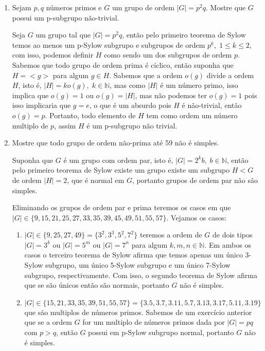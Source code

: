 \documentclass{article}
\begin{document}
\begin{enumerate}
		\item Sejam $p,q$ números primos e $G$ um grupo de ordem $|G| = p^{2}q$. Mostre que $G$ possui um p-subgrupo não-trivial.
		
		Seja $G$ um grupo tal que $|G| = p^{2}q$, então pelo primeiro teorema de Sylow temos ao menos um p-Sylow subgrupo e subgrupos de ordem $p^{k}, \; 1 \leq k \leq 2$, com isso, podemos definir $H$ como sendo um dos subgrupos de ordem $p$. Sabemos que todo grupo de ordem prima é cíclico, então suponha que $H = <g>$ para algum $g \in H$. Sabemos que a ordem $o(g)$ divide a ordem $H$, isto é, $|H| = ko(g), \; k \in \mathbb{N}$, mas como $|H|$ é um número primo, isso implica que $o(g) = 1$ ou $o(g) = |H|$, mas não podemos ter $o(g) = 1$ pois isso implicaria que $g = e$, o que é um absurdo pois $H$ é não-trivial, então $o(g) = p$. Portanto, todo elemento de $H$ tem como ordem um número multiplo de $p$, assim $H$ é um p-subgrupo não trivial.
		
		\item Mostre que todo grupo de ordem não-prima até 59 não é simples.
		
		Suponha que $G$ é um grupo com ordem par, isto é, $|G| = 2^{k}b, \; b \in \mathbb{N}$, então pelo primeiro teorema de Sylow existe um grupo existe um subgrupo $H < G$ de ordem $|H| = 2$, que é normal em $G$, portanto grupos de ordem par não são simples. 
		
		Eliminando os grupos de ordem par e prima teremos os casos em que $|G| \in \{9, 15, 21, 25, 27, 33, 35, 39, 45, 49, 51, 55, 57\}$. Vejamos os casos:
		\begin{enumerate}
			\item $|G| \in \{9, 25, 27, 49\}= \{3^{2}, 3^{3}, 5^{2}, 7^{2}\}$ teremos a ordem de $G$ de dois tipos $|G| =3^{k}$ ou $|G| =5^{m}$ ou $|G| =7^{n}$ para algum $k,m ,n \in \mathbb{N}$. Em ambos os casos o terceiro teorema de Sylow afirma que temos apenas um único 3-Sylow subgrupo, um único 5-Sylow subgrupo e um único 7-Sylow subgrupo, respectivamente. Com isso, o segundo teorema de Sylow afirma que se são únicos então são normais, portanto $G$ não é simples.
			
			\item $|G| \in \{15, 21, 33, 35, 39, 51, 55, 57\}= \{3.5, 3.7, 3.11, 5.7, 3.13, 3.17, 5.11, 3.19\}$ que são multiplos de números primos. Sabemos de um exercício anterior que se a ordem $G$ for um multiplo de números primos dada por $|G| = pq$ com $p>q$, então $G$ possui em p-Sylow subgrupo normal, portanto $G$ não é simples.
			

\end{enumerate}
\end{enumerate}
\end{document}
